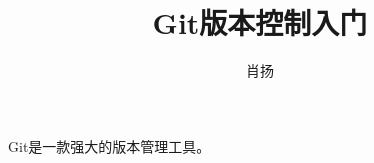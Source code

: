 \documentclass{article}
\title{Git版本控制入门}
\author{肖扬}
\date{}
\begin{document}
\maketitle
Git是一款强大的版本管理工具。
\end{document}
